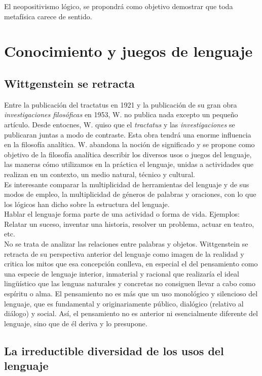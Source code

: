 \documentclass[a4paper, 11pt, twocolumn, spanish]{article}
\begin{document}
El neopositivismo lógico, se propondrá como objetivo demostrar que
toda metafísica carece de sentido.

\section{Conocimiento y juegos de lenguaje}
\label{sec:org6ad9d4b}
\subsection{Wittgenstein se retracta}
\label{sec:org88367e0}
Entre la publicación del tractatus en 1921 y la publicación de su gran
obra \emph{investigaciones filosóficas} en 1953, W. no publica nada excepto
un pequeño artículo. Desde entocnes, W. quiso que el \emph{tractatus} y las
\emph{investigaciones} se publicaran juntas a modo de contraste. Esta obra
tendrá una enorme influencia en la filosofía analítica. W. abandona la
noción de significado y se propone como objetivo de la filosofía
analítica describir los diversos usos o juegos del lenguaje, las
maneras cómo utilizamos en la práctica el lenguaje, unidas a
actividades que realizan en un contexto, un medio natural, técnico y
cultural.\\

Es interesante comparar la multiplicidad de herramientas del lenguaje
y de sus modos de empleo, la multiplicidad de géneros de palabras y
oraciones, con lo que los lógicos han dicho sobre la estructura del
lenguaje.\\
Hablar el lenguaje forma parte de una actividad o forma de
vida. Ejemplos: Relatar un suceso, inventar una historia, resolver un
problema, actuar en teatro, etc.\\

No se trata de analizar las relaciones entre palabras y
objetos. Wittgenstein se retracta de su perspectiva anterior del
lenguaje como imagen de la realidad y critica los mitos que esa
concepción conlleva, en especial el del pensamiento como una especie
de lenguaje interior, inmaterial y racional que realizaría el ideal
lingüístico que las lenguas naturales y concretas no consiguen llevar
a cabo como espíritu o alma. El pensamiento no es más que un uso
monológico y silencioso del lenguaje, que es fundamental y
originariamente público, dialógico (relativo al diálogo) y
social. Así, el pensamiento no es anterior ni esencialmente diferente
del lenguaje, sino que de él deriva y lo presupone.

\subsection{La irreductible diversidad de los usos del lenguaje}
\label{sec:org3a449dc}
\end{document}
